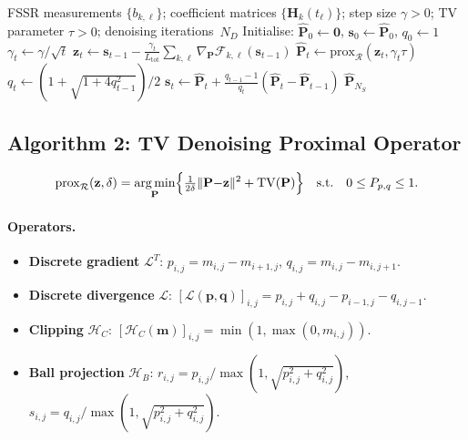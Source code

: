 \documentclass[11pt,a4paper]{article}
\newcommand{\TV}{\mathrm{TV}}
\DeclareMathOperator*{\argmin}{arg\,min}
\begin{document}
\begin{algorithm}[H]
\caption{Gradient descent with TV denoising for shadow profile
retrieval}
\label{alg:profile_retrieval}
\begin{algorithmic}[1]
\Require FSSR measurements $\{b_{k,\ell}\}$; coefficient matrices
$\{\mathbf{H}_k(t_\ell)\}$; step size $\gamma>0$;
TV parameter $\tau>0$; denoising iterations~$N_D$
\State Initialise: $\hat{\mathbf{P}}_0\leftarrow\mathbf{0}$,
$\mathbf{s}_0\leftarrow\hat{\mathbf{P}}_0$, $q_0\leftarrow 1$
  \State $\gamma_t \leftarrow \gamma/\sqrt{t}$
  \State $\mathbf{z}_t \leftarrow \mathbf{s}_{t-1}
    - \frac{\gamma_t}{L_{\mathrm{tot}}}
    \sum_{k,\ell}\nabla_{\mathbf{P}}\mathcal{F}_{k,\ell}
    (\mathbf{s}_{t-1})$
  \State $\hat{\mathbf{P}}_t \leftarrow
    \mathrm{prox}_{\mathcal{R}}(\mathbf{z}_t,\gamma_t\tau)$
  \State $q_t \leftarrow (1{+}\sqrt{1{+}4q_{t-1}^2})/2$
  \State $\mathbf{s}_t \leftarrow \hat{\mathbf{P}}_t
    + \frac{q_{t-1}-1}{q_t}
    (\hat{\mathbf{P}}_t{-}\hat{\mathbf{P}}_{t-1})$
\EndFor
\State \Return $\hat{\mathbf{P}}_{N_S}$
\end{algorithmic}
\end{algorithm}

\subsection{Algorithm 2: TV Denoising Proximal Operator}
\label{sec:alg2}

\begin{equation}
  \mathrm{prox}_{\mathcal{R}}(\mathbf{z},\delta)
  = \argmin_{\mathbf{P}}\Bigl\{
  \tfrac{1}{2\delta}\|\mathbf{P}{-}\mathbf{z}\|^2
  + \TV(\mathbf{P})\Bigr\}
  \quad\text{s.t.}\quad 0\le P_{p,q}\le 1.
  \label{eq:prox_problem}
\end{equation}

\paragraph{Operators.}
\begin{itemize}
  \item \textbf{Discrete gradient}
    $\mathcal{L}^T$:
    $p_{i,j}=m_{i,j}{-}m_{i+1,j}$,\;
    $q_{i,j}=m_{i,j}{-}m_{i,j+1}$.
  \item \textbf{Discrete divergence}
    $\mathcal{L}$:
    $[\mathcal{L}(\mathbf{p},\mathbf{q})]_{i,j}
    = p_{i,j}{+}q_{i,j}{-}p_{i-1,j}{-}q_{i,j-1}$.
  \item \textbf{Clipping}
    $\mathcal{H}_C$:
    $[\mathcal{H}_C(\mathbf{m})]_{i,j}=\min(1,\max(0,m_{i,j}))$.
  \item \textbf{Ball projection}
    $\mathcal{H}_B$:
    $r_{i,j}=p_{i,j}/\max(1,\sqrt{p_{i,j}^2{+}q_{i,j}^2})$,\;
    $s_{i,j}=q_{i,j}/\max(1,\sqrt{p_{i,j}^2{+}q_{i,j}^2})$.
\end{itemize}
\end{document}
